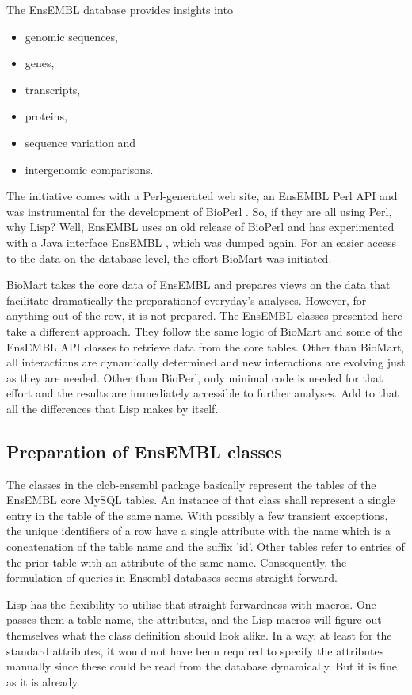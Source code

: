 \documentclass{book}
\newcommand\ensembl{EnsEMBL }
\begin{document}
The \ensembl database provides insights into 
\begin{itemize}
\item genomic sequences,
\item genes,
\item transcripts,
\item proteins,
\item sequence variation and
\item intergenomic comparisons.
\end{itemize}
The initiative comes with a Perl-generated web site, an \ensembl
Perl API and was instrumental for the development of BioPerl
\cite{bioperl:2002}. So, if they are all using Perl, why Lisp? Well,
\ensembl uses an old release of BioPerl and has experimented with a Java
interface \ensembl, which was dumped again. For an easier access to the
data on the database level, the effort BioMart was initiated.

BioMart takes the core data of \ensembl and prepares views on the data that
facilitate dramatically the preparationof everyday's analyses. However,
for anything out of the row, it is not prepared. The \ensembl classes
presented here take a different approach. They follow the same logic of
BioMart and some of the \ensembl API classes to retrieve data from the core
tables. Other than BioMart, all interactions are dynamically determined
and new interactions are evolving just as they are needed. Other than
BioPerl, only minimal code is needed for that effort and the results
are immediately accessible to further analyses. Add to that all the
differences that Lisp makes by itself.

\subsection{Preparation of \ensembl classes}

The classes in the clcb-ensembl package basically represent the tables of
the \ensembl core MySQL tables. An instance of that class shall represent 
a single entry in the table of the same name. With possibly a few transient
exceptions, the unique identifiers of a row have a single attribute with the 
name which is a concatenation of the table name and the suffix 'id'. Other
tables refer to entries of the prior table with an attribute of the same name.
Consequently, the formulation of queries in Ensembl databases seems straight
forward.

Lisp has the flexibility to utilise that straight-forwardness with
macros. One passes them a table name, the attributes, and the Lisp macros
will figure out themselves what the class definition should look alike.
In a way, at least for the standard attributes, it would not have benn required to
specify the attributes manually since these could be read from the database dynamically.
But it is fine as it is already.
\end{document}
